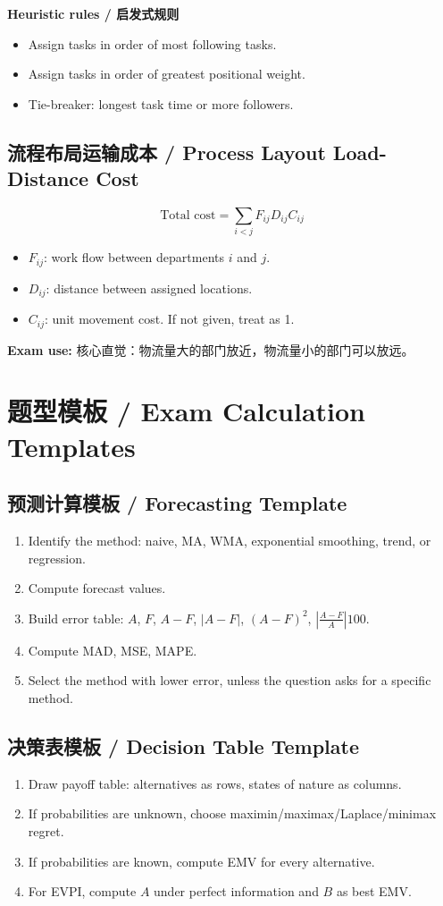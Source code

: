 \documentclass[10pt,a4paper]{ctexart}
\newcommand{\exam}[1]{\textcolor{Amber}{\textbf{Exam use:} #1}}
\begin{document}
\textbf{Heuristic rules / 启发式规则}
\begin{itemize}
  \item Assign tasks in order of most following tasks.
  \item Assign tasks in order of greatest positional weight.
  \item Tie-breaker: longest task time or more followers.
\end{itemize}

\subsection{流程布局运输成本 / Process Layout Load-Distance Cost}
\label{subsec:load-distance}
\[
\text{Total cost}=\sum_{i<j}F_{ij}D_{ij}C_{ij}
\]
\begin{itemize}
  \item $F_{ij}$: work flow between departments $i$ and $j$.
  \item $D_{ij}$: distance between assigned locations.
  \item $C_{ij}$: unit movement cost. If not given, treat as 1.
\end{itemize}
\exam{核心直觉：物流量大的部门放近，物流量小的部门可以放远。}

\section{题型模板 / Exam Calculation Templates}
\label{sec:templates}

\subsection{预测计算模板 / Forecasting Template}
\begin{enumerate}
  \item Identify the method: naive, MA, WMA, exponential smoothing, trend, or regression.
  \item Compute forecast values.
  \item Build error table: $A$, $F$, $A-F$, $|A-F|$, $(A-F)^2$, $\left|\frac{A-F}{A}\right|100$.
  \item Compute MAD, MSE, MAPE.
  \item Select the method with lower error, unless the question asks for a specific method.
\end{enumerate}

\subsection{决策表模板 / Decision Table Template}
\begin{enumerate}
  \item Draw payoff table: alternatives as rows, states of nature as columns.
  \item If probabilities are unknown, choose maximin/maximax/Laplace/minimax regret.
  \item If probabilities are known, compute EMV for every alternative.
  \item For EVPI, compute $A$ under perfect information and $B$ as best EMV.
\end{enumerate}
\end{document}
